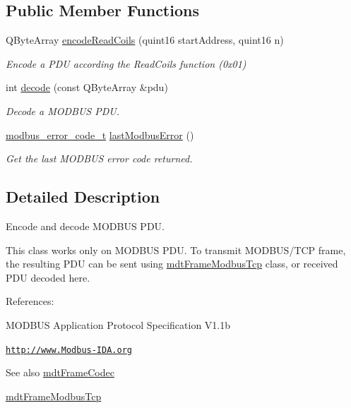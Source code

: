 \subsection*{Public Member Functions}
\begin{DoxyCompactItemize}
\item 
QByteArray \hyperlink{classmdt_frame_codec_modbus_adf0a4d583aeff7b818dda94514c594f0}{encodeReadCoils} (quint16 startAddress, quint16 n)
\begin{DoxyCompactList}\small\item\em Encode a PDU according the ReadCoils function (0x01) \end{DoxyCompactList}\item 
int \hyperlink{classmdt_frame_codec_modbus_a426f465363a49d70890a462b40677787}{decode} (const QByteArray \&pdu)
\begin{DoxyCompactList}\small\item\em Decode a MODBUS PDU. \end{DoxyCompactList}\item 
\hyperlink{classmdt_frame_codec_modbus_a31d8291be7f8636d5d295ce3066d7ac7}{modbus\_\-error\_\-code\_\-t} \hyperlink{classmdt_frame_codec_modbus_a21f3102e12f1a1d9c4145c1ce1f8e6b6}{lastModbusError} ()
\begin{DoxyCompactList}\small\item\em Get the last MODBUS error code returned. \end{DoxyCompactList}\end{DoxyCompactItemize}


\subsection{Detailed Description}
Encode and decode MODBUS PDU. 

This class works only on MODBUS PDU. To transmit MODBUS/TCP frame, the resulting PDU can be sent using \hyperlink{classmdt_frame_modbus_tcp}{mdtFrameModbusTcp} class, or received PDU decoded here.

References:
\begin{DoxyItemize}
\item MODBUS Application Protocol Specification V1.1b
\item \href{http://www.Modbus-IDA.org}{\tt http://www.Modbus-\/IDA.org}
\end{DoxyItemize}

\begin{DoxySeeAlso}{See also}
\hyperlink{classmdt_frame_codec}{mdtFrameCodec} 

\hyperlink{classmdt_frame_modbus_tcp}{mdtFrameModbusTcp} 
\end{DoxySeeAlso}



